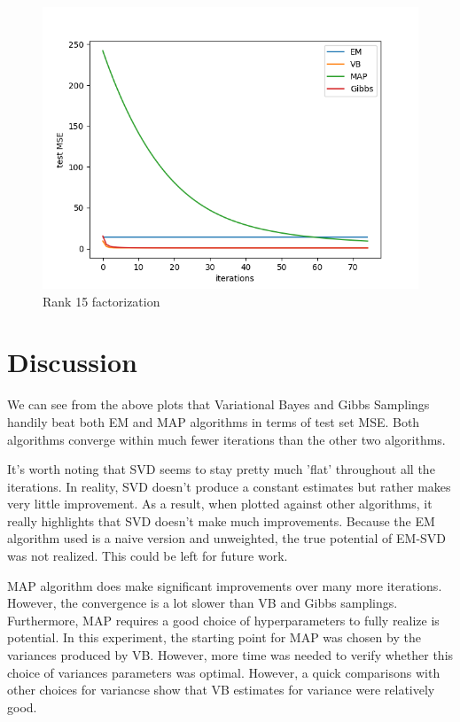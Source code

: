 \documentclass[journal,onecolumn]{IEEEtran}
\begin{document}
\begin{figure}[H]
	\centering
	\includegraphics[width=150mm]{rank_15.png}
	\caption{Rank 15 factorization}
\end{figure}

\section{Discussion}
We can see from the above plots that Variational Bayes and Gibbs Samplings handily beat both EM and MAP algorithms in terms of test set MSE. Both algorithms converge within much fewer iterations than the other two algorithms.

It's worth noting that SVD seems to stay pretty much 'flat' throughout all the iterations. In reality, SVD doesn't produce a constant estimates but rather makes very little improvement. As a result, when plotted against other algorithms, it really highlights that SVD doesn't make much improvements. Because the EM algorithm used is a naive version and unweighted, the true potential of EM-SVD was not realized. This could be left for future work.

MAP algorithm does make significant improvements over many more iterations. However, the convergence is a lot slower than VB and Gibbs samplings. Furthermore, MAP requires a good choice of hyperparameters to fully realize is potential. In this experiment, the starting point for MAP was chosen by the variances produced by VB. However, more time was needed to verify whether this choice of variances parameters was optimal. However, a quick comparisons with other choices for variancse show that VB estimates for variance were relatively good.
\end{document}

